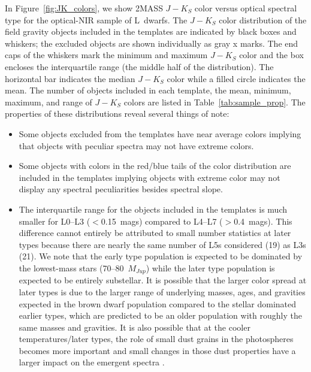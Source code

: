 \documentclass[12pt,preprint]{aastex}
\begin{document}
In Figure~\ref{fig:JK_colors}, we show 2MASS $J-K_S$ color versus optical spectral type for the optical-NIR sample of L~dwarfs. 
The $J-K_S$ color distribution of the field gravity objects included in the templates are indicated by black boxes and whiskers; the excluded objects are shown individually as gray x marks.
The end caps of the whiskers mark the minimum and maximum $J-K_S$ color and the box encloses the interquartile range (the middle half of the distribution). The horizontal bar indicates the median $J-K_S$ color while a filled circle indicates the mean.
The number of objects included in each template, the mean, minimum, maximum, and range of $J-K_S$ colors are listed in Table~\ref{tab:sample_prop}. 
The properties of these distributions reveal several things of note:
\begin{itemize}
\item Some objects excluded from the templates have near average colors implying that objects with peculiar spectra may not have extreme colors. 
\item Some objects with colors in the red/blue tails of the color distribution are included in the templates implying objects with extreme color may not display any spectral peculiarities besides spectral slope.
\item The interquartile range for the objects included in the templates is much smaller for L0--L3 ($<$0.15~mags) compared to L4--L7 ($>$0.4~mags).
This difference cannot entirely be attributed to small number statistics at later types because there are nearly the same number of L5s considered (19) as L3s (21).
We note that the early type population is expected to be dominated by the lowest-mass stars (70--80~$M_{Jup}$) while the later type population is expected to be entirely substellar. 
It is possible that the larger color spread at later types is due to the larger range of underlying masses, ages, and gravities expected in the brown dwarf population compared to the stellar dominated earlier types, which are predicted to be an older population with roughly the same masses and gravities.
It is also possible that at the cooler temperatures/later types, the role of small dust grains in the photospheres becomes more important and small changes in those dust properties have a larger impact on the emergent spectra \citep{Burgasser08_blue,Marocco:2014kr,Hiranaka:2015va}.
\end{itemize}
\end{document}
